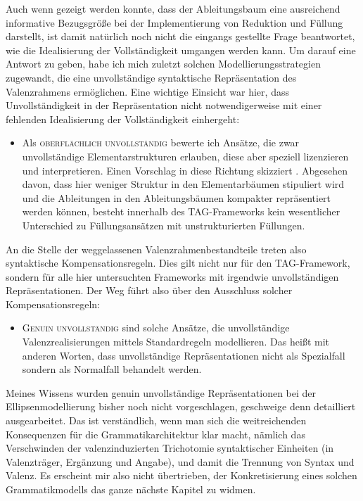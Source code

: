 Auch wenn gezeigt werden konnte, dass der Ableitungsbaum eine ausreichend informative Bezugsgröße bei der Implementierung von Reduktion und Füllung darstellt, ist damit natürlich noch nicht die eingangs gestellte Frage beantwortet, wie die Idealisierung der Vollständigkeit umgangen werden kann. Um darauf eine Antwort zu geben, habe ich mich zuletzt solchen Modellierungsstrategien zugewandt, die eine unvollständige syntaktische Repräsentation des Valenzrahmens ermöglichen. Eine wichtige Einsicht war hier, dass Unvollständigkeit in der Repräsentation nicht notwendigerweise mit einer fehlenden Idealisierung der Vollständigkeit einhergeht:
\begin{itemize}
  \item Als \textsc{oberflächlich unvollständig} bewerte ich Ansätze, die zwar unvollständige Elementarstrukturen erlauben, diese aber speziell lizenzieren und interpretieren. Einen Vorschlag in diese Richtung skizziert \cite{Sarkar:97}. Abgesehen davon, dass hier weniger Struktur in den Elementarbäumen stipuliert wird und die Ableitungen in den Ableitungsbäumen kompakter repräsentiert werden können, besteht innerhalb des TAG-Frameworks kein wesentlicher Unterschied zu Füllungsansätzen mit unstrukturierten Füllungen.
\end{itemize}  
An die Stelle der weggelassenen Valenzrahmenbestandteile treten also syntaktische Kompensationsregeln. Dies gilt nicht nur für den TAG-Framework, sondern für alle hier untersuchten Frameworks mit irgendwie unvollständigen Repräsentationen. Der Weg führt also über den Ausschluss solcher Kompensationsregeln: 
\begin{itemize}   
  \item \textsc{Genuin unvollständig} sind solche Ansätze, die unvollständige Valenzrealisierungen mittels Standardregeln modellieren. Das heißt mit anderen Worten, dass unvollständige Repräsentationen nicht als Spezialfall sondern als Normalfall behandelt werden. 
\end{itemize}
Meines Wissens wurden genuin unvollständige Repräsentationen bei der Ellipsenmodellierung bisher noch nicht vorgeschlagen, geschweige denn detailliert ausgearbeitet. Das ist verständlich, wenn man sich die weitreichenden  Konsequenzen für die Grammatikarchitektur klar macht, nämlich das Verschwinden der valenzinduzierten  Trichotomie syntaktischer Einheiten (in Valenzträger, Ergänzung und Angabe), und damit die Trennung von Syntax und Valenz. Es erscheint mir also nicht übertrieben, der Konkretisierung eines solchen Grammatikmodells das ganze nächste Kapitel zu widmen.



  